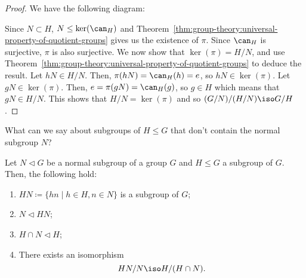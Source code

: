 \documentclass[12pt]{report}
\begin{document}
\begin{proof}
  We have the following diagram:
  \begin{center}
  \end{center}

  Since \(N \subset H\), \(N \leq \ker(\can_{H})\) and Theorem~\ref{thm:group-theory:universal-property-of-quotient-groups} gives us the existence of \(\pi\).
  Since \(\can_{H}\) is surjective, \(\pi\) is also surjective.
  We now show that \(\ker(\pi) = H/N\), and use Theorem~\ref{thm:group-theory:universal-property-of-quotient-groups} to deduce the result.
  Let \(hN \in H/N\).
  Then, \(\pi(hN) = \can_{H}(h) = e\), so \(hN \in \ker(\pi)\).
  Let \(gN \in \ker(\pi)\).
  Then, \(e = \pi(gN) = \can_{H}(g)\), so \(g \in H\) which means that \(gN \in H/N\).
  This shows that \(H/N = \ker(\pi)\) and so \((G/N) / (H/N) \iso G/H\).
\end{proof}

What can we say about subgroups of \(H \leq G\) that don't contain the normal subgroup \(N\)?

\begin{theorem}
 \label{thm:group-theory:second-isomorphism-theorem}
 Let \(N \triangleleft G\) be a normal subgroup of a group \(G\) and  \(H \leq G\) a subgroup of \(G\).
 Then, the following hold:
 \begin{enumerate}
 \item
   \(HN \coloneqq \{hn \mid h \in H, n \in N\}\) is a subgroup of \(G\);
 \item
   \(N \triangleleft HN\);
 \item
   \(H \cap N \triangleleft H\);
 \item
   There exists an isomorphism
   \[HN/N \iso H/(H\cap N).\]
 \end{enumerate}
\end{theorem}
\end{document}
